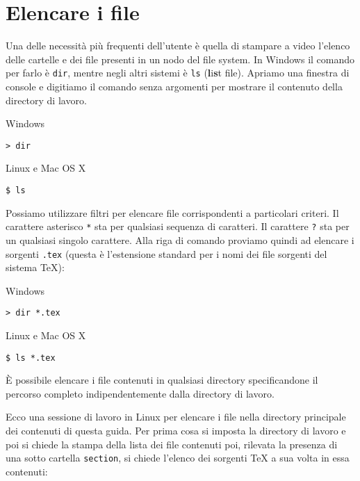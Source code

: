 \section{Elencare i file}

Una delle necessità più frequenti dell'utente è quella di stampare a video l'elenco delle cartelle e dei file presenti in un nodo del file system. In Windows il comando per farlo è \texttt{dir}, mentre negli altri sistemi è \texttt{ls} (\textbf{l}i\textbf{s}t file). Apriamo una finestra di console e digitiamo il comando senza argomenti per mostrare il contenuto della directory di lavoro.

\noindent\begin{tcolorbox}[width=(\linewidth-6pt)/2,before=,after=\hfill]
Windows\tcblower
\begin{verbatim}
> dir
\end{verbatim}
\end{tcolorbox}
\begin{tcolorbox}[width=(\linewidth-6pt)/2,before=,after=\hfill]
Linux e Mac OS X\tcblower
\begin{verbatim}
$ ls
\end{verbatim}
\end{tcolorbox}

Possiamo utilizzare filtri per elencare file corrispondenti a particolari criteri. Il carattere asterisco \texttt{*} sta per qualsiasi sequenza di caratteri. Il carattere \texttt{?} sta per un qualsiasi singolo carattere. Alla riga di comando proviamo quindi ad elencare i sorgenti \texttt{.tex} (questa è l'estensione standard per i nomi dei file sorgenti del sistema \TeX):

\noindent\begin{tcolorbox}[width=(\linewidth-6pt)/2,before=,after=\hfill]
Windows\tcblower
\begin{verbatim}
> dir *.tex
\end{verbatim}
\end{tcolorbox}
\begin{tcolorbox}[width=(\linewidth-6pt)/2,before=,after=\hfill]
Linux e Mac OS X\tcblower
\begin{verbatim}
$ ls *.tex
\end{verbatim}
\end{tcolorbox}

\`E possibile elencare i file contenuti in qualsiasi directory specificandone il percorso completo indipendentemente dalla directory di lavoro.

Ecco una sessione di lavoro in Linux per elencare i file nella directory principale dei contenuti di questa guida. Per prima cosa si imposta la directory di lavoro e poi si chiede la stampa della lista dei file contenuti poi, rilevata la presenza di una sotto cartella \texttt{section}, si chiede l'elenco dei sorgenti \TeX{} a sua volta in essa contenuti:

